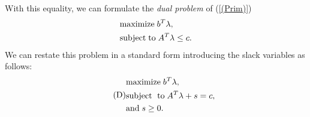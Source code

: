 \documentclass[a4paper,10 pt,titlepage,twoside]{book}
\theoremstyle{plain}
\theoremstyle{definition}
\theoremstyle{remark}
\begin{document}
With this equality, we can formulate the \textit{dual problem} of (\ref{(Prim)})
\begin{equation}\label{Dual}
\begin{split}
&\text{maximize\;} b^{T}\lambda,\\
&\text{subject\;to\;}A^{T}\lambda \leq c.
\end{split}
\end{equation} 
We can restate this problem in a standard form introducing the slack variables as follows:
\begin{equation}\tag{D}\label{(Dual)}
\begin{split}
&\text{maximize\;}b^{T}\lambda,\\
&\text{subject\; to\;}A^{T}\lambda+s=c,\\ &\text{and\;} s\geq0.
\end{split}
\end{equation}
\end{document}
